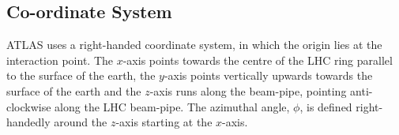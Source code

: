 
\subsection{Co-ordinate System}
\label{sec:det-coordinate}

ATLAS uses a right-handed coordinate system, in which the origin lies at the interaction point.
The $x$-axis points towards the centre of the LHC ring parallel to the surface of the earth,
the $y$-axis points vertically upwards towards the surface of the earth
and the $z$-axis runs along the beam-pipe, pointing anti-clockwise along the LHC beam-pipe.
The azimuthal angle, $\phi$, is defined right-handedly around the $z$-axis starting at the $x$-axis.

